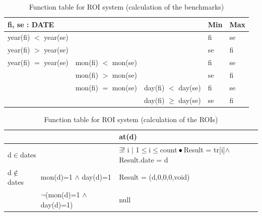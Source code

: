 \documentclass[runningheads,12pt]{article}
\begin{document}
\begin{table}[H]
{
\centering

\begin{tabular}{|l|l|l||l|l|}
\hline
\multicolumn{3}{|l||}{fi, se : DATE} & Min & Max\\ 

\hline
\multicolumn{3}{|l||}{year(fi) $<$ year(se)} & fi & se\\ 

\hline
\multicolumn{3}{|l||}{year(fi) $>$ year(se)} & se & fi\\ 

\hline
year(fi) $=$ year(se) & \multicolumn{2}{|l||}{mon(fi) $<$ mon(se)} & fi & se\\ 

\cline{2-5}
& \multicolumn{2}{|l||}{mon(fi) $>$ mon(se)} & se & fi\\

\cline{2-5}
& mon(fi) $=$ mon(se) & day(fi) $<$ day(se) & fi & se\\

\cline{3-5}
& & day(fi) $\ge$ day(se) & se &  fi\\

\hline
\end{tabular}

\caption{Function table for ROI system (calculation of the benchmarks)}
\label{table:ftable_bench}
}
\end{table}
\begin{table}[H]
{
\centering

\begin{tabular}{|l|l||l|}
\hline
\multicolumn{2}{|c||}{} & at(d)\\ 

\hline
\multicolumn{2}{|l||}{d$\in$dates} & $\exists$! i $|$ 1$\le$i$\le$count$\,\bullet\,$Result = tr[i]$\wedge$Result.date = d\\ 

\hline
d$\notin$dates & mon(d)=1 $\wedge$ day(d)=1 & Result = (d,0,0,0,void)\\

\cline{2-3}
& $\lnot$(mon(d)=1 $\wedge$ day(d)=1) & null\\

%
%
%
\hline
\end{tabular}

\caption{Function table for ROI system (calculation of the ROIs)}
\label{table:ftable_ROI}
}
\end{table}
\end{document}
